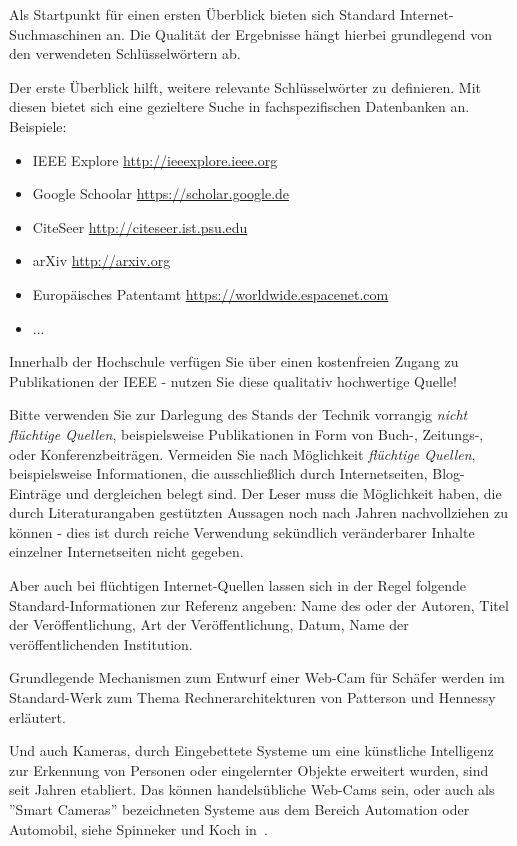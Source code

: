 Als Startpunkt für einen ersten Überblick bieten sich Standard Internet-Suchmaschinen an. Die Qualität der Ergebnisse hängt hierbei grundlegend von den verwendeten Schlüsselwörtern ab. 

Der erste Überblick hilft, weitere relevante Schlüsselwörter zu definieren. Mit diesen bietet sich eine gezieltere Suche in fachspezifischen Datenbanken an. Beispiele:

\begin{itemize}
\item IEEE Explore \url{http://ieeexplore.ieee.org}
\item Google Schoolar \url{https://scholar.google.de}
\item CiteSeer \url{http://citeseer.ist.psu.edu}
\item arXiv \url{http://arxiv.org}
\item Europäisches Patentamt \url{https://worldwide.espacenet.com}
\item ...
\end{itemize}

Innerhalb der Hochschule verfügen Sie über einen kostenfreien Zugang zu Publikationen der IEEE - nutzen Sie diese qualitativ hochwertige Quelle! 

Bitte verwenden Sie zur Darlegung des Stands der Technik vorrangig \emph{nicht flüchtige Quellen}, beispielsweise Publikationen in Form von Buch-, Zeitungs-, oder Konferenzbeiträgen.
Vermeiden Sie nach Möglichkeit \emph{flüchtige Quellen}, beispielsweise Informationen, die ausschließlich durch Internetseiten, Blog-Einträge und dergleichen belegt sind. Der Leser muss die Möglichkeit haben, die durch Literaturangaben gestützten Aussagen noch nach Jahren nachvollziehen zu können - dies ist durch reiche Verwendung sekündlich veränderbarer Inhalte einzelner Internetseiten nicht gegeben.

Aber auch bei flüchtigen Internet-Quellen lassen sich in der Regel folgende Standard-Informationen zur Referenz angeben: Name des oder der Autoren, Titel der Veröffentlichung, Art der Veröffentlichung, Datum, Name der veröffentlichenden Institution.

\example Grundlegende Mechanismen zum Entwurf einer Web-Cam für Schäfer werden im Standard-Werk zum Thema Rechnerarchitekturen von Patterson und Hennessy~\cite{patterson2005} erläutert. 

Und auch Kameras, durch Eingebettete Systeme um eine künstliche Intelligenz zur Erkennung von Personen oder eingelernter Objekte erweitert wurden, sind seit Jahren etabliert.
Das können handelsübliche Web-Cams sein, oder auch als ''Smart Cameras'' bezeichneten Systeme aus dem Bereich Automation oder Automobil, siehe Spinneker und Koch in~\cite{spinneker2014}.

